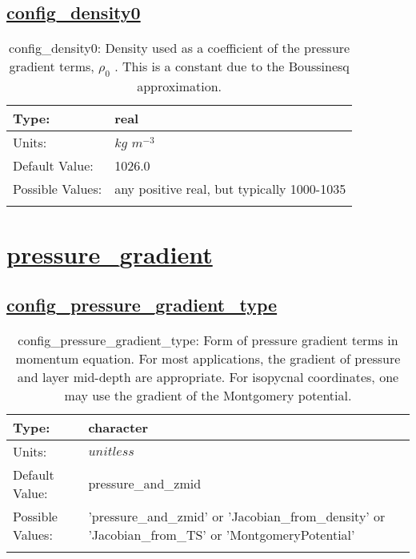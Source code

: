\subsection[config\_density0]{\hyperref[sec:nm_tab_ocean_constants]{config\_density0}}
\label{subsec:nm_sec_config_density0}
\begin{center}
\begin{longtable}{| p{2.0in} || p{4.0in} |}
    \hline
    Type: & real \\
    \hline
    Units: & $kg$ $m^{-3}$ \\
    \hline
    Default Value: & 1026.0 \\
    \hline
    Possible Values: & any positive real, but typically 1000-1035 \\
    \hline
    \caption{config\_density0:  Density used as a coefficient of the pressure gradient terms,  $\rho_0$ . This is a constant due to the Boussinesq approximation.}
\end{longtable}
\end{center}
\section[pressure\_gradient]{\hyperref[sec:nm_tab_pressure_gradient]{pressure\_gradient}}
\label{sec:nm_sec_pressure_gradient}
\subsection[config\_pressure\_gradient\_type]{\hyperref[sec:nm_tab_pressure_gradient]{config\_pressure\_gradient\_type}}
\label{subsec:nm_sec_config_pressure_gradient_type}
\begin{center}
\begin{longtable}{| p{2.0in} || p{4.0in} |}
    \hline
    Type: & character \\
    \hline
    Units: & $unitless$ \\
    \hline
    Default Value: & pressure\_and\_zmid \\
    \hline
    Possible Values: & 'pressure\_and\_zmid' or 'Jacobian\_from\_density' or 'Jacobian\_from\_TS' or 'MontgomeryPotential' \\
    \hline
    \caption{config\_pressure\_gradient\_type: Form of pressure gradient terms in momentum equation. For most applications, the gradient of pressure and layer mid-depth are appropriate.  For isopycnal coordinates, one may use the gradient of the Montgomery potential.}
\end{longtable}
\end{center}
